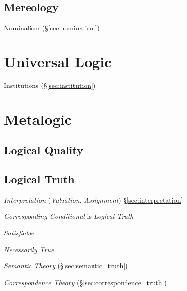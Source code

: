 \subsection{Mereology}\label{sec:mereology}

Nominalism (\S\ref{sec:nominalism})



\section{Universal Logic}\label{sec:universal_logic}

Institutions (\S\ref{sec:institution})



\section{Metalogic}\label{sec:metalogic}

\subsection{Logical Quality}\label{sec:logical_quality}

\subsection{Logical Truth}\label{sec:logical_truth}

\emph{Interpretation} (\emph{Valuation}, \emph{Assignment})
\S\ref{sec:interpretation}

\emph{Corresponding Conditional} is \emph{Logical Truth}

\emph{Satisfiable}

\emph{Necessarily True}

\emph{Semantic Theory} (\S\ref{sec:semantic_truth})

\emph{Correspondence Theory} (\S\ref{sec:correspondence_truth})

